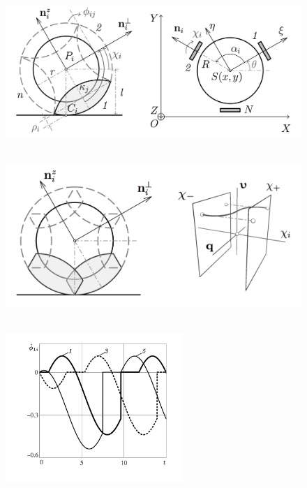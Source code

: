 \begin{figure}[H]
    \hspace{-15pt}
    \includegraphics[scale=0.25]{pic/pic_wheel_cart_300.png}
    \caption{\ }
    \label{fig:wheel}
\end{figure}

\begin{figure}[H]
    \hspace{25pt}
    \includegraphics[scale=0.25]{pic/pic_overlap_change_300.png}
    \caption{\ }
    \label{fig:overlap_and_change}
\end{figure}


\begin{figure}[H]
  \hspace{2.73cm}\includegraphics[width=0.6\textwidth]{pic/figure5_1.png}
  \caption{\ }
  \label{fig:selfrot}
\end{figure}

